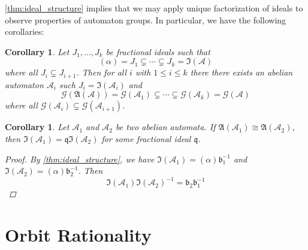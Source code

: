 \documentclass[12pt, letterpaper]{article}
\newcommand{\A}{\mathcal A}
\newcommand{\princ}{\mathfrak A}
\newcommand{\gp}{\mathcal G}
\newcommand{\ideal}{\mathfrak{I}}
\newtheorem{cor}[thm]{Corollary}
\begin{document}
\cref{thm:ideal_structure} implies that we may apply unique factorization of
ideals to observe properties of automaton groups. In particular, we have the
following corollaries:

\begin{cor}\label{cor:intermediate-ideal-factors}
    Let $J_1, \ldots, J_k$ be fractional ideals such that
    \[
        (\alpha) = J_1 \subsetneq \cdots \subsetneq J_k = \ideal(\A)
    \]
    where all $J_i \subsetneq J_{i+1}$.  Then for all $i$ with $1 \le i \le k$
    there there exists an abelian automaton $\A_i$ such $J_i = \ideal(\A_i)$
    and
    \[
        \gp(\princ(\A)) = \gp(\A_1) \subsetneq \cdots \subsetneq
        \gp(\A_k) = \gp(\A)
    \]
    where all $\gp(\A_i) \subsetneq \gp(\A_{i+1})$.
\end{cor}

\begin{cor}\label{cor:group-unique-factorization}
    Let $\A_1$ and $\A_2$ be two abelian automata.  If $\princ(\A_1) \cong
    \princ(\A_2)$, then $\ideal(\A_1) = \mathfrak{q} \ideal(\A_2)$ for some
    fractional ideal $\mathfrak{q}$.
    \begin{proof}
        By \cref{thm:ideal_structure}, we have
        $\ideal(\A_1) = (\alpha) \mathfrak{b}_1^{-1}$ and
        $\ideal(\A_2) = (\alpha) \mathfrak{b}_2^{-1}$. Then
        \[
            \ideal(\A_1) \ideal(\A_2)^{-1} = \mathfrak{b}_2 \mathfrak{b}_1^{-1}
        \]
    \end{proof}
\end{cor}

\pagebreak
\section{Orbit Rationality}
\end{document}
